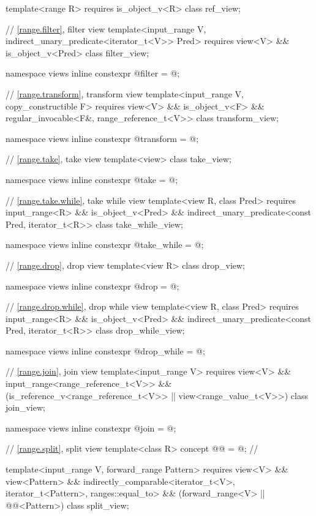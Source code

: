 \begin{codeblock}
{  template<range R>
    requires is_object_v<R>
  class ref_view;

  // \ref{range.filter}, filter view
  template<input_range V, indirect_unary_predicate<iterator_t<V>> Pred>
    requires view<V> && is_object_v<Pred>
  class filter_view;

  namespace views { inline constexpr @\unspec@ filter = @\unspec@; }

  // \ref{range.transform}, transform view
  template<input_range V, copy_constructible F>
    requires view<V> && is_object_v<F> &&
             regular_invocable<F&, range_reference_t<V>>
  class transform_view;

  namespace views { inline constexpr @\unspec@ transform = @\unspec@; }

  // \ref{range.take}, take view
  template<view> class take_view;

  namespace views { inline constexpr @\unspec@ take = @\unspec@; }

  // \ref{range.take.while}, take while view
  template<view R, class Pred>
    requires input_range<R> && is_object_v<Pred> &&
      indirect_unary_predicate<const Pred, iterator_t<R>>
    class take_while_view;

  namespace views { inline constexpr @\unspec@ take_while = @\unspec@; }

  // \ref{range.drop}, drop view
  template<view R>
    class drop_view;

  namespace views { inline constexpr @\unspec@ drop = @\unspec@; }

  // \ref{range.drop.while}, drop while view
  template<view R, class Pred>
    requires input_range<R> && is_object_v<Pred> &&
      indirect_unary_predicate<const Pred, iterator_t<R>>
    class drop_while_view;

  namespace views { inline constexpr @\unspec@ drop_while = @\unspec@; }

  // \ref{range.join}, join view
  template<input_range V>
    requires view<V> && input_range<range_reference_t<V>> &&
             (is_reference_v<range_reference_t<V>> ||
              view<range_value_t<V>>)
  class join_view;

  namespace views { inline constexpr @\unspec@ join = @\unspec@; }

  // \ref{range.split}, split view
  template<class R>
    concept @@ = @\seebelow@;   // \expos

  template<input_range V, forward_range Pattern>
    requires view<V> && view<Pattern> &&
             indirectly_comparable<iterator_t<V>, iterator_t<Pattern>, ranges::equal_to> &&
             (forward_range<V> || @@<Pattern>)
  class split_view;

}
\end{codeblock}
